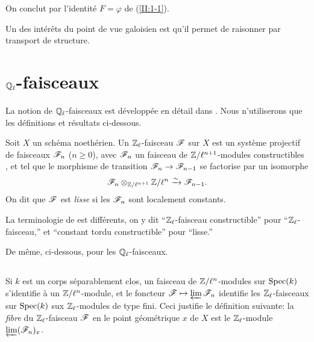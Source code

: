 On conclut par l'identité $F=\varphi$ de (\ref{II:1-1}). 

Un des intérêts du point de vue galoisien est qu'il permet de raisonner par 
transport de structure. 










\section{\texorpdfstring{$\mathbb{Q}_\ell$}{Ql}-faisceaux}\label{II:2}

La notion de $\mathbb{Q}_\ell$-faisceaux est développée en détail dans 
\cite[V,VI]{SGA5}. Nous n'utiliserons que les définitions et résultats 
ci-dessous. 





\begin{definition_}\label{II:2-1}
Soit $X$ un schéma noethérien. Un $\mathbb{Z}_\ell$-faisceau $\mathscr{F}$ sur $X$ est un 
système projectif de faisceaux $\mathscr{F}_n$ ($n\geqslant 0$), avec $\mathscr{F}_n$ un 
faisceau de $\mathbb{Z}/\ell^{n+1}$-modules constructibles \cite[IX.2]{sga4}, et tel que 
le morphisme de transition $\mathscr{F}_n\to\mathscr{F}_{n-1}$ se factorise par un isomorphe 
\[
  \mathscr{F}_n\otimes_{\mathbb{Z}/\ell^{n+1}} \mathbb{Z}/\ell^n \xrightarrow\sim \mathscr{F}_{n-1}\text{.}
\]
On dit que $\mathscr{F}$ est \emph{lisse} si les $\mathscr{F}_n$ sont localement constants. 
\end{definition_}

La terminologie de \cite{SGA5} est différents, on y dit ``$\mathbb{Z}_\ell$-faisceau 
constructible'' pour ``$\mathbb{Z}_\ell$-faisceau,'' et ``constant tordu 
constructible'' pour ``lisse.'' 

De même, ci-dessous, pour les $\mathbb{Q}_\ell$-faisceaux. 





\subsection{}\label{II:2-2}

Si $k$ est un corps séparablement clos, un faisceau de $\mathbb{Z}/\ell^n$-modules 
sur $\operatorname{Spec}(k)$ s'identifie à un $\mathbb{Z}/\ell^n$-module, et le foncteur 
$\mathscr{F}\mapsto \varprojlim \mathscr{F}_n$ identifie les $\mathbb{Z}_\ell$-faisceaux sur 
$\operatorname{Spec}(k)$ sux $\mathbb{Z}_\ell$-modules de type fini. Ceci justifie le définition 
suivante: la \emph{fibre} du $\mathbb{Z}_\ell$-faisceau $\mathscr{F}$ en le point 
géométrique $x$ de $X$ est le $\mathbb{Z}_\ell$-module $\varprojlim (\mathscr{F}_n)_x$. 





